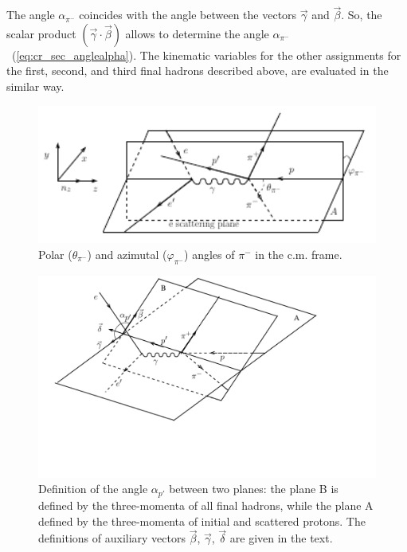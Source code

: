 The angle $\alpha_{\pi^{-}}$ coincides with
 the angle between the vectors $\vec \gamma$ and
$\vec \beta$.
So, the scalar product $( \vec \gamma \cdot
\vec \beta )$ allows to determine the angle
$\alpha_{\pi^{-}}$~(\ref{eq:cr_sec_anglealpha}). The kinematic
variables for  the other assignments for the
first, second, and third final hadrons
described above, are evaluated in the similar
way.
\begin{figure}[htp]
\begin{center}
\includegraphics[width=12cm]{pictures/cross_sction/angles/thetaphi.pdf}
\caption{\small Polar ($\theta_{\pi^{-}}$) and azimutal ($\varphi_{\pi^{-}}$) angles of $\pi^{-}$ in the c.m. frame.} \label{fig:cr_sec_thetaphi}
\end{center}
\end{figure}
\begin{figure}[htp]
\begin{center}
\includegraphics[width=12cm]{pictures/cross_sction/angles/alpha2.pdf}
\caption{\small Definition of the angle $\alpha_{p'}$ between two planes: the plane B is defined by the three-momenta of all final hadrons, while the plane A defined by  the three-momenta of initial and scattered protons. The definitions of  auxiliary vectors $\vec \beta$, $\vec \gamma$, $\vec \delta$ are given in the text.} \label{fig:cr_sec_kinematic1}
\end{center}
\end{figure}

